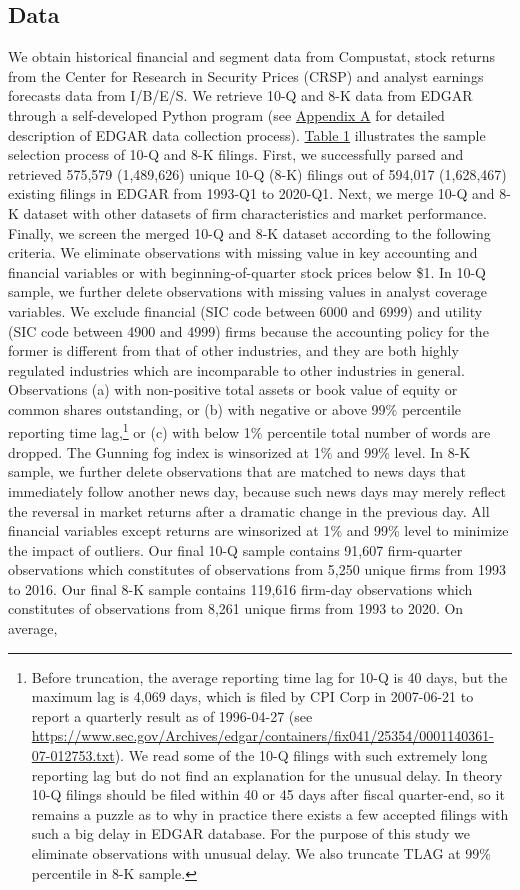 \documentclass[a4paper]{article}
\begin{document}
\begin{spacing}{2}
\subsection{Data}
We obtain historical financial and segment data from Compustat, stock returns from the Center for Research in Security Prices (CRSP) and analyst earnings forecasts data from I/B/E/S. We retrieve 10-Q and 8-K data from EDGAR through a self-developed Python program (see \hyperref[appa]{Appendix A} for detailed description of EDGAR data collection process). \hyperref[T1]{Table 1} illustrates the sample selection process of 10-Q and 8-K filings. First, we successfully parsed and retrieved 575,579 (1,489,626) unique 10-Q (8-K) filings out of 594,017 (1,628,467) existing filings in EDGAR from 1993-Q1 to 2020-Q1. Next, we merge 10-Q and 8-K dataset with other datasets of firm characteristics and market performance. Finally, we screen the merged 10-Q and 8-K dataset according to the following criteria. We eliminate observations with missing value in key accounting and financial variables or with beginning-of-quarter stock prices below \$1. In 10-Q sample, we further delete observations with missing values in analyst coverage variables. We exclude financial (SIC code between 6000 and 6999) and utility (SIC code between 4900 and 4999) firms because the accounting policy for the former is different from that of other industries, and they are both highly regulated industries which are incomparable to other industries in general. Observations (a) with non-positive total assets or book value of equity or common shares outstanding, or (b) with negative or above 99\% percentile reporting time lag,\footnote{Before truncation, the average reporting time lag for 10-Q is 40 days, but the maximum lag is 4,069 days, which is filed by CPI Corp in 2007-06-21 to report a quarterly result as of 1996-04-27 (see \url{https://www.sec.gov/Archives/edgar/containers/fix041/25354/0001140361-07-012753.txt}). We read some of the 10-Q filings with such extremely long reporting lag but do not find an explanation for the unusual delay. In theory 10-Q filings should be filed within 40 or 45 days after fiscal quarter-end, so it remains a puzzle as to why in practice there exists a few accepted filings with such a big delay in EDGAR database. For the purpose of this study we eliminate observations with unusual delay. We also truncate TLAG at 99\% percentile in 8-K sample.} or (c) with below 1\% percentile total number of words are dropped. The Gunning fog index is winsorized at 1\% and 99\% level. In 8-K sample, we further delete observations that are matched to news days that immediately follow another news day, because such news days may merely reflect the reversal in market returns after a dramatic change in the previous day. All financial variables except returns are winsorized at 1\% and 99\% level to minimize the impact of outliers. Our final 10-Q sample contains 91,607 firm-quarter observations which constitutes of observations from 5,250 unique firms from 1993 to 2016. Our final 8-K sample contains 119,616 firm-day observations which constitutes of observations from 8,261 unique firms from 1993 to 2020. On average, 
\end{spacing}
\end{document}
